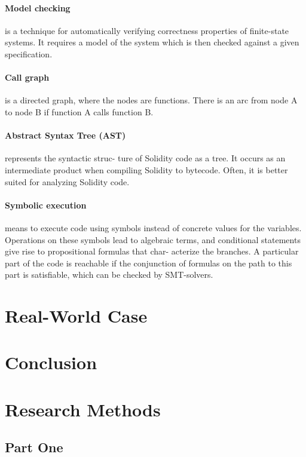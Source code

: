 \documentclass[a4paper,sigconf, language=french,
language=german, language=spanish, language=english]{acmart}
\begin{document}
\paragraph{Model checking} is a technique for automatically verifying
correctness properties of ﬁnite-state systems. It requires a
model of the system which is then checked against a given
speciﬁcation.
\paragraph{Call graph} is a directed graph, where the nodes are
functions. There is an arc from node A to node B if
function A calls function B.
\paragraph{Abstract Syntax Tree (AST)}represents the syntactic struc-
ture of Solidity code as a tree. It occurs as an intermediate
product when compiling Solidity to bytecode. Often, it is
better suited for analyzing Solidity code.
\paragraph{Symbolic execution} means to execute code using symbols
instead of concrete values for the variables. Operations
on these symbols lead to algebraic terms, and conditional
statements give rise to propositional formulas that char-
acterize the branches. A particular part of the code is
reachable if the conjunction of formulas on the path to this
part is satisﬁable, which can be checked by SMT-solvers.

\section{Real-World Case}
\label{RealCase}

\section{Conclusion}
\label{Conclusion}


\begin{acks}

\end{acks}




\appendix

\section{Research Methods}

\subsection{Part One}
\end{document}
